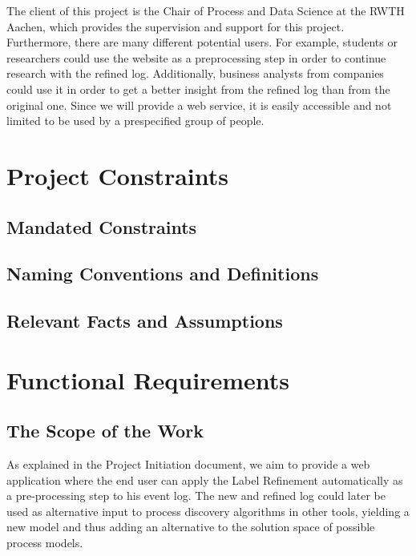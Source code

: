 \documentclass[notitlepage]{article}
\begin{document}
\begin{flushleft}
The client of this project is the Chair of Process and Data Science at the RWTH Aachen, which provides the supervision and support for this project. Furthermore, there are many different potential users. For example, students or researchers could use the website as a preprocessing step in order to continue research with the refined log. Additionally, business analysts from companies could use it in order to get a better insight from the refined log than from the original one. Since we will provide a web service, it is easily accessible and not limited to be used by a prespecified group of people. 

\section{Project Constraints}

\subsection{Mandated Constraints}

\subsection{Naming Conventions and Definitions}

\subsection{Relevant Facts and Assumptions}


\section{Functional Requirements}

\subsection{The Scope of the Work}
As explained in the Project Initiation document, we aim to provide a web application where the end user can apply the Label Refinement automatically as a pre-processing step to his event log.
The new and refined log could later be used as alternative input to process discovery algorithms in other tools, yielding a new model and thus adding an alternative to the solution space of possible process models.



\end{flushleft}
\end{document}
